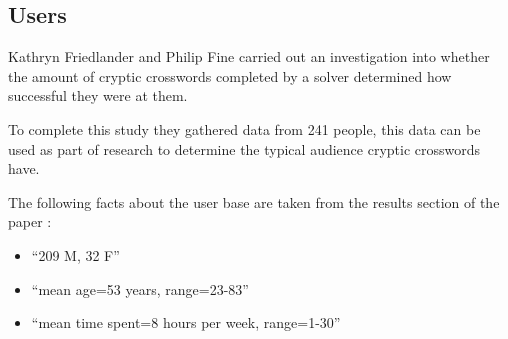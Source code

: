 \subsection{Users}

Kathryn Friedlander and Philip Fine \citep{friedlander09} carried out an
investigation into whether the amount of cryptic crosswords completed by a
solver determined how successful they were at them. 

To complete this study they gathered data from 241 people, this data can be 
used as part of research to determine the typical audience cryptic crosswords 
have. 

The following facts about the user base are taken from the results section of 
the paper \citep{friedlander09}:

\begin{itemize}
    \item ``209 M, 32 F''
    \item ``mean age=53 years, range=23-83''
    \item ``mean time spent=8 hours per week, range=1-30''
\end{itemize}